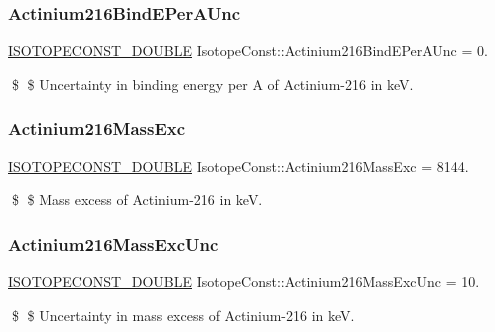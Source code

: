\subsubsection{\texorpdfstring{Actinium216\+Bind\+E\+Per\+A\+Unc}{Actinium216BindEPerAUnc}}
{\footnotesize\ttfamily \mbox{\hyperlink{group___isotope_const-_macros_ga8f45a7272ce02c0b4c65c44636ed719a}{I\+S\+O\+T\+O\+P\+E\+C\+O\+N\+S\+T\+\_\+\+D\+O\+U\+B\+LE}} Isotope\+Const\+::\+Actinium216\+Bind\+E\+Per\+A\+Unc = 0.}

\$ \$ Uncertainty in binding energy per A of Actinium-\/216 in keV. \mbox{\label{group___isotope_const-_actinium-_ac216_ga0672ff8f92e8c29120cfe064d032ba25}} 
\subsubsection{\texorpdfstring{Actinium216\+Mass\+Exc}{Actinium216MassExc}}
{\footnotesize\ttfamily \mbox{\hyperlink{group___isotope_const-_macros_ga8f45a7272ce02c0b4c65c44636ed719a}{I\+S\+O\+T\+O\+P\+E\+C\+O\+N\+S\+T\+\_\+\+D\+O\+U\+B\+LE}} Isotope\+Const\+::\+Actinium216\+Mass\+Exc = 8144.}

\$ \$ Mass excess of Actinium-\/216 in keV. \mbox{\label{group___isotope_const-_actinium-_ac216_ga89349ecb388bc9ff6df13ec9121f1cdc}} 
\subsubsection{\texorpdfstring{Actinium216\+Mass\+Exc\+Unc}{Actinium216MassExcUnc}}
{\footnotesize\ttfamily \mbox{\hyperlink{group___isotope_const-_macros_ga8f45a7272ce02c0b4c65c44636ed719a}{I\+S\+O\+T\+O\+P\+E\+C\+O\+N\+S\+T\+\_\+\+D\+O\+U\+B\+LE}} Isotope\+Const\+::\+Actinium216\+Mass\+Exc\+Unc = 10.}

\$ \$ Uncertainty in mass excess of Actinium-\/216 in keV. \mbox{\label{group___isotope_const-_actinium-_ac216_ga56d1a4c76811080682cd55c495079216}} 
